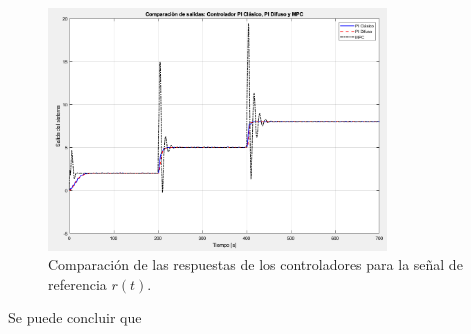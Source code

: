 \begin{enumerate}
\begin{figure}
        \includegraphics[width=0.8\textwidth]{img/Figure_17}
        \caption{Comparación de las respuestas de los controladores para la señal de referencia \(r(t)\).}
        \label{fig:17}
    \end{figure}
    Se puede concluir que
\end{enumerate}
